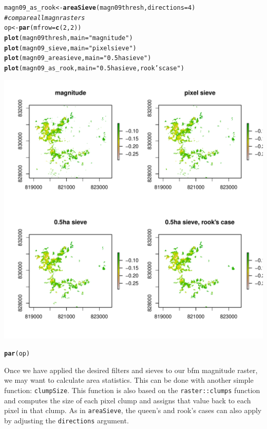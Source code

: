 \documentclass{article}\usepackage[]{graphicx}\usepackage[]{color}
\makeatletter
\def\maxwidth{ %
  \ifdim\Gin@nat@width>\linewidth
    \linewidth
  \else
    \Gin@nat@width
  \fi
}
\newcommand{\hlnum}[1]{\textcolor[rgb]{0.686,0.059,0.569}{#1}}%
\newcommand{\hlstr}[1]{\textcolor[rgb]{0.192,0.494,0.8}{#1}}%
\newcommand{\hlcom}[1]{\textcolor[rgb]{0.678,0.584,0.686}{\textit{#1}}}%
\newcommand{\hlstd}[1]{\textcolor[rgb]{0.345,0.345,0.345}{#1}}%
\newcommand{\hlkwb}[1]{\textcolor[rgb]{0.69,0.353,0.396}{#1}}%
\newcommand{\hlkwc}[1]{\textcolor[rgb]{0.333,0.667,0.333}{#1}}%
\newcommand{\hlkwd}[1]{\textcolor[rgb]{0.737,0.353,0.396}{\textbf{#1}}}%
\newenvironment{kframe}{%
 \def\at@end@of@kframe{}%
 \ifinner\ifhmode%
  \def\at@end@of@kframe{\end{minipage}}%
  \begin{minipage}{\columnwidth}%
 \fi\fi%
 \def\FrameCommand##1{\hskip\@totalleftmargin \hskip-\fboxsep
 \colorbox{shadecolor}{##1}\hskip-\fboxsep
     \hskip-\linewidth \hskip-\@totalleftmargin \hskip\columnwidth}%
 \MakeFramed {\advance\hsize-\width
   \@totalleftmargin\z@ \linewidth\hsize
   \@setminipage}}%
 {\par\unskip\endMakeFramed%
 \at@end@of@kframe}
\newenvironment{knitrout}{}{} %
\def\code#1{\texttt{#1}}
\makeatother
\begin{document}
\begin{knitrout}
\color{fgcolor}\begin{kframe}
\begin{alltt}
\hlstd{magn09_as_rook} \hlkwb{<-} \hlkwd{areaSieve}\hlstd{(magn09thresh,} \hlkwc{directions} \hlstd{=} \hlnum{4}\hlstd{)}
\hlcom{# compare all magn rasters}
\hlstd{op} \hlkwb{<-} \hlkwd{par}\hlstd{(}\hlkwc{mfrow} \hlstd{=} \hlkwd{c}\hlstd{(}\hlnum{2}\hlstd{,} \hlnum{2}\hlstd{))}
\hlkwd{plot}\hlstd{(magn09thresh,} \hlkwc{main} \hlstd{=} \hlstr{"magnitude"}\hlstd{)}
\hlkwd{plot}\hlstd{(magn09_sieve,} \hlkwc{main} \hlstd{=} \hlstr{"pixel sieve"}\hlstd{)}
\hlkwd{plot}\hlstd{(magn09_areasieve,} \hlkwc{main} \hlstd{=} \hlstr{"0.5ha sieve"}\hlstd{)}
\hlkwd{plot}\hlstd{(magn09_as_rook,} \hlkwc{main} \hlstd{=} \hlstr{"0.5ha sieve, rook's case"}\hlstd{)}
\end{alltt}
\end{kframe}
\includegraphics[width=\maxwidth]{figure/areaSieve-rook} 
\begin{kframe}\begin{alltt}
\hlkwd{par}\hlstd{(op)}
\end{alltt}
\end{kframe}
\end{knitrout}


Once we have applied the desired filters and sieves to our bfm magnitude raster, we may want to calculate area statistics. This can be done with another simple function: \code{clumpSize}. This function is also based on the \code{raster::clumps} function and computes the size of each pixel clump and assigns that value back to each pixel in that clump. As in \code{areaSieve}, the queen's and rook's cases can also apply by adjusting the \code{directions} argument.
\end{document}
